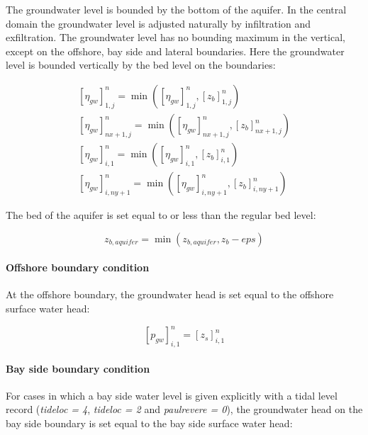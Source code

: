 The groundwater level is bounded by the bottom of the aquifer. In the central domain the groundwater level is adjusted naturally by infiltration and exfiltration. The groundwater level has no bounding maximum in the vertical, except on the offshore, bay side and lateral boundaries. Here the groundwater level is bounded vertically by the bed level on the boundaries:

\begin{equation} \label{2.97)} 
\begin{array}{l} {\left[\eta _{gw} \right]_{1,j}^{n} =\min \left(\left[\eta _{gw} \right]_{1,j}^{n} ,\left[z_{b} \right]_{1,j}^{n} \right)} \\ {\left[\eta _{gw} \right]_{nx+1,j}^{n} =\min \left(\left[\eta _{gw} \right]_{nx+1,j}^{n} ,\left[z_{b} \right]_{nx+1,j}^{n} \right)} \\ {\left[\eta _{gw} \right]_{i,1}^{n} =\min \left(\left[\eta _{gw} \right]_{i,1}^{n} ,\left[z_{b} \right]_{i,1}^{n} \right)} \\ {\left[\eta _{gw} \right]_{i,ny+1}^{n} =\min \left(\left[\eta _{gw} \right]_{i,ny+1}^{n} ,\left[z_{b} \right]_{i,ny+1}^{n} \right)} \end{array} 
\end{equation} 

The bed of the aquifer is set equal to or less than the regular bed level:

\begin{equation} \label{2.98)} 
z_{b,aquifer} =\min \left(z_{b,aquifer} ,z_{b} -eps\right) 
\end{equation} 

\paragraph{Offshore boundary condition}

At the offshore boundary, the groundwater head is set equal to the offshore surface water head:

\begin{equation} \label{2.99)} 
\left[p_{gw} \right]_{i,1}^{n} =\left[z_{s} \right]_{i,1}^{n}  
\end{equation} 

\paragraph{Bay side boundary condition}

For cases in which a bay side water level is given explicitly with a tidal level record (\textit{tideloc = 4}, \textit{tideloc = 2} and \textit{paulrevere = 0}), the groundwater head on the bay side boundary is set equal to the bay side surface water head:

